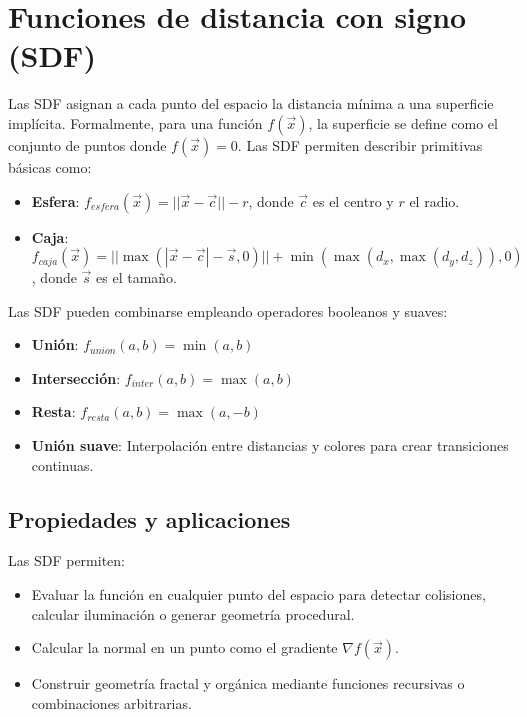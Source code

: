 \section{Funciones de distancia con signo (SDF)}

Las SDF asignan a cada punto del espacio la distancia mínima a una superficie
implícita. Formalmente, para una función $f(\vec{x})$, la superficie se define
como el conjunto de puntos donde $f(\vec{x}) = 0$. Las SDF permiten describir
primitivas básicas como:

\begin{itemize}
    \item \textbf{Esfera}: $f_{esfera}(\vec{x}) = ||\vec{x} - \vec{c}|| - r$, donde $\vec{c}$ es el centro y $r$ el radio.
    \item \textbf{Caja}: $f_{caja}(\vec{x}) = ||\max(|\vec{x} - \vec{c}| - \vec{s}, 0)|| + \min(\max(d_x, \max(d_y, d_z)), 0)$, donde $\vec{s}$ es el tamaño.
\end{itemize}

Las SDF pueden combinarse empleando operadores booleanos y suaves:

\begin{itemize}
    \item \textbf{Unión}: $f_{union}(a, b) = \min(a, b)$
    \item \textbf{Intersección}: $f_{inter}(a, b) = \max(a, b)$
    \item \textbf{Resta}: $f_{resta}(a, b) = \max(a, -b)$
    \item \textbf{Unión suave}: Interpolación entre distancias y colores para crear transiciones continuas.
\end{itemize}

\subsection{Propiedades y aplicaciones}

Las SDF permiten:

\begin{itemize}
    \item Evaluar la función en cualquier punto del espacio para detectar colisiones,
          calcular iluminación o generar geometría procedural.
    \item Calcular la normal en un punto como el gradiente $\nabla f(\vec{x})$.
    \item Construir geometría fractal y orgánica mediante funciones recursivas o
          combinaciones arbitrarias.
\end{itemize}

